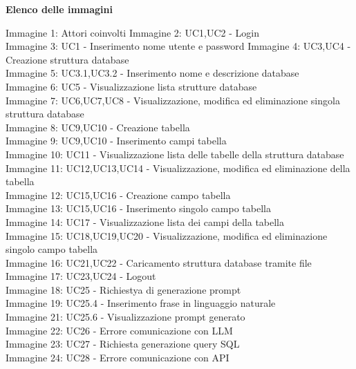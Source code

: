 \documentclass[5pt]{article}
\begin{document}
\pagebreak
\tableofcontents
\pagebreak
	\begin{flushleft}
\textbf{\Large Elenco delle immagini} 

\begin{spacing}{1.5} 

Immagine 1: Attori coinvolti \newline
Immagine 2: UC1,UC2 - Login \\
Immagine 3: UC1 - Inserimento nome utente e password \newline
Immagine 4: UC3,UC4 - Creazione struttura database \\
Immagine 5: UC3.1,UC3.2 - Inserimento nome e descrizione database \\
	Immagine 6: UC5 - Visualizzazione lista strutture database \\
	Immagine 7: UC6,UC7,UC8 - Visualizzazione, modifica ed eliminazione singola struttura database \\
	Immagine 8: UC9,UC10 - Creazione tabella \\
	Immagine 9: UC9,UC10 - Inserimento campi tabella \\
	Immagine 10: UC11 - Visualizzazione lista delle tabelle della struttura database \\
	Immagine 11: UC12,UC13,UC14 - Visualizzazione, modifica ed eliminazione della tabella \\
	Immagine 12: UC15,UC16 - Creazione campo tabella \\
	Immagine 13: UC15,UC16 - Inserimento singolo campo tabella \\
	Immagine 14: UC17 - Visualizzazione lista dei campi della tabella \\
	Immagine 15: UC18,UC19,UC20 - Visualizzazione, modifica ed eliminazione singolo campo tabella \\
	Immagine 16: UC21,UC22 - Caricamento struttura database tramite file \\
	Immagine 17: UC23,UC24 - Logout \\
	Immagine 18: UC25 - Richiestya di generazione prompt \\
	Immagine 19: UC25.4 - Inserimento frase in linguaggio naturale \\
	Immagine 21: UC25.6 - Visualizzazione prompt generato \\
	Immagine 22: UC26 - Errore comunicazione con LLM \\
	Immagine 23: UC27 - Richiesta generazione query SQL \\
	Immagine 24: UC28 - Errore comunicazione con API 
\end{spacing}
\end{flushleft}
\end{document}
